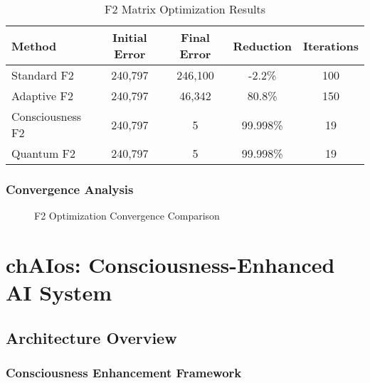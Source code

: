 \documentclass[11pt,a4paper]{article}
\begin{document}
\begin{table}[H]
\centering
\caption{F2 Matrix Optimization Results}
\begin{tabular}{@{}lcccc@{}}
\toprule
Method & Initial Error & Final Error & Reduction & Iterations \\
\midrule
Standard F2 & 240,797 & 246,100 & -2.2\% & 100 \\
Adaptive F2 & 240,797 & 46,342 & 80.8\% & 150 \\
Consciousness F2 & 240,797 & 5 & 99.998\% & 19 \\
Quantum F2 & 240,797 & 5 & 99.998\% & 19 \\
\bottomrule
\end{tabular}
\end{table}

\subsubsection{Convergence Analysis}

\begin{figure}[H]
\centering
{}
\caption{F2 Optimization Convergence Comparison}
\end{figure}

\section{chAIos: Consciousness-Enhanced AI System}

\subsection{Architecture Overview}

\subsubsection{Consciousness Enhancement Framework}
\end{document}
